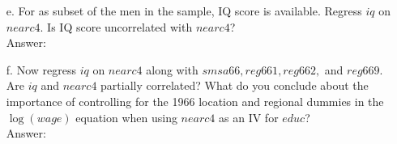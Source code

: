 \documentclass[10pt]{article}
\begin{document}
\begin{enumerate}
\item[e.] For as subset of the men in the sample, IQ score is available. Regress $iq$ on $nearc4.$ Is IQ score uncorrelated with $nearc4$?
\\ Answer:\\

\item[f.] Now regress $iq$ on $nearc4$ along with $smsa66, reg661, reg662,$ and $reg669.$ Are $iq$ and $nearc4$ partially correlated? What do you conclude about the importance of controlling for the 1966 location and regional dummies in the $\log(wage)$ equation when using $nearc4$ as an IV for $educ$?
\\ Answer:\\

\end{enumerate}
\end{document}
